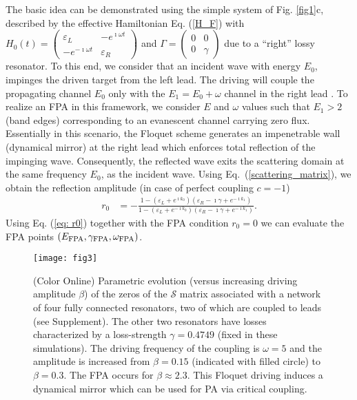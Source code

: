 \documentclass[aps,prl,twocolumn,showpacs,groupedaddress,amsmath,amssymb]{revtex4}
\begin{document}
The basic idea can be demonstrated using the simple system of Fig. \ref{fig1}c, described by the effective Hamiltonian Eq. (\ref{H_F}) with 
$H_{0}\left(t\right)=\begin{pmatrix}\varepsilon_{L} & -e^{\imath\omega t}\\
-e^{-\imath\omega t} & \varepsilon_{R}
\end{pmatrix}$ and $\Gamma=\begin{pmatrix}0 & 0\\
0 & \gamma
\end{pmatrix}$ due to a ``right'' lossy resonator. To this end, we consider that an incident wave with energy $E_0$, impinges the driven target from  
the left lead. The driving will couple the propagating channel $E_{0}$ only with the $E_{1}=E_0+\omega$ channel in the right lead \cite{LKS18}. To 
realize an FPA in this framework, we consider $E$ and $\omega$ values such that $E_{1}>2$ (band edges) corresponding to an evanescent 
channel carrying zero flux. Essentially in this scenario, the Floquet scheme generates an impenetrable wall (dynamical mirror) at the right lead 
which enforces total reflection of the impinging wave. Consequently, the reflected wave exits the scattering domain at the same frequency $E_0$, 
as the incident wave. Using Eq.~(\ref{scattering_matrix}), we obtain the reflection amplitude (in case of perfect coupling $c=-1$)
\begin{align}
r_{0} & =-\frac{1-\left(\varepsilon_{L}+e^{\imath k_{0}}\right)\left(\varepsilon_{R}-\imath\gamma+e^{-\imath k_{1}}\right)}{1-\left(\varepsilon_{L}
+e^{-\imath k_{0}}\right)\left(\varepsilon_{R}-\imath\gamma+e^{-\imath k_{1}}\right)}.
\label{eq: r0}
\end{align}
Using Eq. (\ref{eq: r0}) together with the FPA condition $r_{0}=0$ we can evaluate the FPA points $(E_{\rm FPA},\gamma_{\rm FPA},
\omega_{\rm FPA})$. 

\begin{figure}
\texttt{[image: fig3]}
\caption{(Color Online) Parametric evolution (versus increasing driving amplitude $\beta$) of the zeros of the $\mathcal{S}$ matrix 
associated with a network of four fully connected resonators, two of which are coupled to leads (see Supplement). The other two 
resonators have losses characterized by a loss-strength $\gamma=0.4749$ (fixed in these simulations). The driving frequency of the 
coupling is $\omega=5$ and the amplitude is increased from $\beta=0.15$ (indicated with filled circle) to $\beta=0.3$. The FPA occurs 
for $\beta\approx 2.3$. This Floquet driving induces a dynamical mirror which can be used for PA via critical coupling.
}
\label{fig3}
\end{figure}
\end{document}

